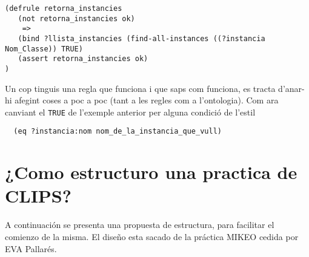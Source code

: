 \documentclass[11pt,svgnames]{scrbook}
\begin{document}
\begin{verbatim}
(defrule retorna_instancies
   (not retorna_instancies ok)
    =>
   (bind ?llista_instancies (find-all-instances ((?instancia Nom_Classe)) TRUE)
   (assert retorna_instancies ok)
)
\end{verbatim}

Un cop tinguis una regla que funciona i que saps com funciona, es tracta
d'anar-hi afegint coses a poc a poc (tant a les regles com a l'ontologia). Com
ara canviant el \texttt{TRUE} de l'exemple anterior per alguna condició de
l'estil

\begin{verbatim}
  (eq ?instancia:nom nom_de_la_instancia_que_vull)
\end{verbatim}


\section{¿Como estructuro una practica de CLIPS?}

A continuación se presenta una propuesta de estructura, para facilitar el comienzo de la misma.
El diseño esta sacado de la práctica  MIKEO cedida por EVA Pallarés.
\end{document}
